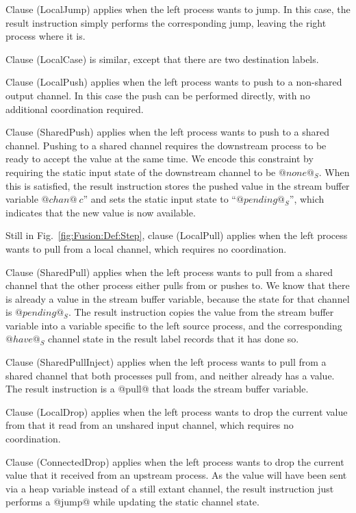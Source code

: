 Clause (LocalJump) applies when the left process wants to jump.
In this case, the result instruction simply performs the corresponding jump, leaving the right process where it is. 

Clause (LocalCase) is similar, except that there are two destination labels.

Clause (LocalPush) applies when the left process wants to push to a non-shared output channel.
In this case the push can be performed directly, with no additional coordination required.

Clause (SharedPush) applies when the left process wants to push to a shared channel. Pushing to a shared channel requires the downstream process to be ready to accept the value at the same time. We encode this constraint by requiring the static input state of the downstream channel to be $@none@_S$. When this is satisfied, the result instruction stores the pushed value in the stream buffer variable $@chan@~c$'' and sets the static input state to ``$@pending@_S$'', which indicates that the new value is now available. 

Still in Fig.~\ref{fig:Fusion:Def:Step}, clause (LocalPull) applies when the left process wants to pull from a local channel, which requires no coordination.

Clause (SharedPull) applies when the left process wants to pull from a shared channel that the other process either pulls from or pushes to. We know that there is already a value in the stream buffer variable, because the state for that channel is $@pending@_S$. The result instruction copies the value from the stream buffer variable into a variable specific to the left source process, and the corresponding $@have@_S$ channel state in the result label records that it has done so.

Clause (SharedPullInject) applies when the left process wants to pull from a shared channel that both processes pull from, and neither already has a value. The result instruction is a @pull@ that loads the stream buffer variable.

Clause (LocalDrop) applies when the left process wants to drop the current value from that it read from an unshared input channel, which requires no coordination.

Clause (ConnectedDrop) applies when the left process wants to drop the current value that it received from an upstream process. As the value will have been sent via a heap variable instead of a still extant channel, the result instruction just performs a @jump@ while updating the static channel state.

